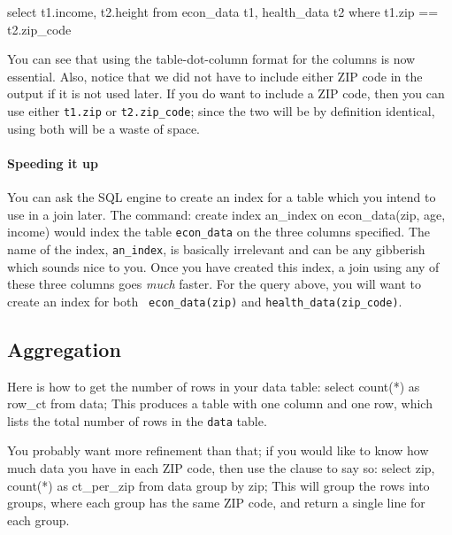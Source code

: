 select t1.income, t2.height
   from econ_data t1, health_data t2
   where t1.zip == t2.zip_code

You can see that using the table-dot-column format for the columns is now
essential. Also, notice that we did not have to include either ZIP code
in the output if it is not used later. If you do want to include a ZIP
code, then you can use either {\tt t1.zip} or {\tt t2.zip\_code}; since
the two will be by definition identical, using both will be a waste of
space.

\paragraph{Speeding it up}
You can ask the SQL engine to create an index for a table which you
intend to use in a join later. The command:
create index an_index on econ_data(zip, age, income)
would index the table {\tt econ\_data} on the three columns specified.
The name of the index, {\tt an\_index}, is basically irrelevant and can
be any gibberish which sounds nice to you. Once you have created this
index, a join using any of these three columns goes {\sl much} faster.
For the query above, you will want to create an index for both {\tt
econ\_data(zip)} and {\tt health\_data(zip\_code)}.

\subsection{Aggregation}
Here is how to get the number of rows in your data table:
select count(*) as row_ct 
from data;
This produces a table with one column and one row, which lists the total number of rows in the {\tt data} table.

You probably want more refinement than that; if you would like to
know how much data you have in each ZIP code, then use the  clause to say so:
select zip, count(*) as ct_per_zip
from data
group by zip;
This will group the rows into groups, where each group has the same ZIP
code, and return a single line for each group.


